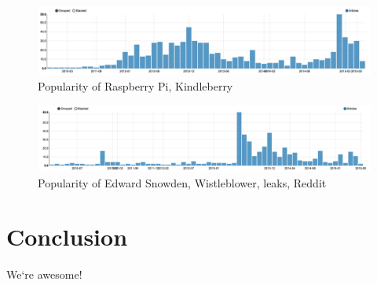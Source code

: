 \begin{figure}[H]
	\caption{Popularity of Raspberry Pi, Kindleberry}
	\label{fig:trend_raspberry}
	\centering
	\includegraphics[width=14cm]{topic_trends/raspberry}
\end{figure}

\begin{figure}[H]
	\caption{Popularity of Edward Snowden, Wistleblower, leaks, Reddit}
	\label{fig:trend_snowden}
	\centering
	\includegraphics[width=14cm]{topic_trends/snowden}
\end{figure}



\section{Conclusion}
We`re awesome!
